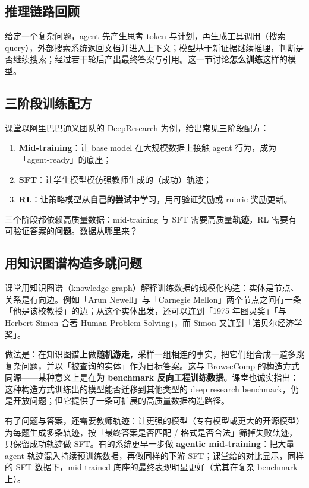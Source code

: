 \documentclass[a4paper]{article}
\begin{document}
\subsection{推理链路回顾}

给定一个复杂问题，agent 先产生思考 token 与计划，再生成工具调用（搜索 query），外部搜索系统返回文档并进入上下文；模型基于新证据继续推理，判断是否继续搜索；经过若干轮后产出最终答案与引用。这一节讨论\textbf{怎么训练}这样的模型。

\subsection{三阶段训练配方}

课堂以阿里巴巴通义团队的 DeepResearch 为例，给出常见三阶段配方：

\begin{enumerate}
\item \textbf{Mid-training}：让 base model 在大规模数据上接触 agent 行为，成为「agent-ready」的底座；
\item \textbf{SFT}：让学生模型模仿强教师生成的（成功）轨迹；
\item \textbf{RL}：让策略模型从\textbf{自己的尝试}中学习，用可验证奖励或 rubric 奖励更新。
\end{enumerate}

三个阶段都依赖高质量数据：mid-training 与 SFT 需要高质量\textbf{轨迹}，RL 需要有可验证答案的\textbf{问题}。数据从哪里来？

\subsection{用知识图谱构造多跳问题}

课堂用知识图谱（knowledge graph）解释训练数据的规模化构造：实体是节点、关系是有向边。例如「Arun Newell」与「Carnegie Mellon」两个节点之间有一条「他是该校教授」的边；从这个实体出发，还可以连到「1975 年图灵奖」「与 Herbert Simon 合著 Human Problem Solving」，而 Simon 又连到「诺贝尔经济学奖」。

做法是：在知识图谱上做\textbf{随机游走}，采样一组相连的事实，把它们组合成一道多跳复杂问题，并以「被查询的实体」作为目标答案。这与 BrowseComp 的构造方式同源——某种意义上是在\textbf{为 benchmark 反向工程训练数据}。课堂也诚实指出：这种构造方式训练出的模型能否迁移到其他类型的 deep research benchmark，仍是开放问题；但它提供了一条可扩展的高质量数据构造路径。

有了问题与答案，还需要教师轨迹：让更强的模型（专有模型或更大的开源模型）为每题生成多条轨迹，按「最终答案是否匹配 / 格式是否合法」筛掉失败轨迹，只保留成功轨迹做 SFT。有的系统更早一步做 \textbf{agentic mid-training}：把大量 agent 轨迹混入持续预训练数据，再做同样的下游 SFT；课堂给的对比显示，同样的 SFT 数据下，mid-trained 底座的最终表现明显更好（尤其在复杂 benchmark 上）。
\end{document}
